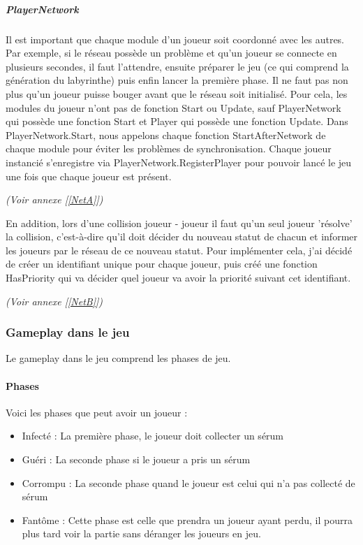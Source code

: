 \documentclass{article}
\begin{document}
\subparagraph{PlayerNetwork}

Il est important que chaque module d'un joueur soit coordonné avec les autres. Par exemple, si le réseau possède un problème et qu'un joueur se connecte en plusieurs secondes, il faut l'attendre, ensuite préparer le jeu (ce qui comprend la génération du labyrinthe) puis enfin lancer la première phase. Il ne faut pas non plus qu'un joueur puisse bouger avant que le réseau soit initialisé.
Pour cela, les modules du joueur n'ont pas de fonction Start ou Update, sauf PlayerNetwork qui possède une fonction Start et Player qui possède une fonction Update. Dans PlayerNetwork.Start, nous appelons chaque fonction StartAfterNetwork de chaque module pour éviter les problèmes de synchronisation.
Chaque joueur instancié s'enregistre via PlayerNetwork.RegisterPlayer pour pouvoir lancé le jeu une fois que chaque joueur est présent.

\emph{(Voir annexe [\ref{NetA}])}

En addition, lors d'une collision joueur - joueur il faut qu'un seul joueur 'résolve' la collision, c'est-à-dire qu'il doit décider du nouveau statut de chacun et informer les joueurs par le réseau de ce nouveau statut.
Pour implémenter cela, j'ai décidé de créer un identifiant unique pour chaque joueur, puis créé une fonction HasPriority qui va décider quel joueur va avoir la priorité suivant cet identifiant.

\emph{(Voir annexe [\ref{NetB}])}

\newpage
\subsubsection{Gameplay dans le jeu}

Le gameplay dans le jeu comprend les phases de jeu.

\paragraph{Phases}

Voici les phases que peut avoir un joueur :

\begin{itemize}
\item Infecté : La première phase, le joueur doit collecter un sérum

\item Guéri : La seconde phase si le joueur a pris un sérum

\item Corrompu : La seconde phase quand le joueur est celui qui n'a pas collecté de sérum

\item Fantôme : Cette phase est celle que prendra un joueur ayant perdu, il pourra plus tard voir la partie sans déranger les joueurs en jeu.
\end{itemize}
\end{document}
